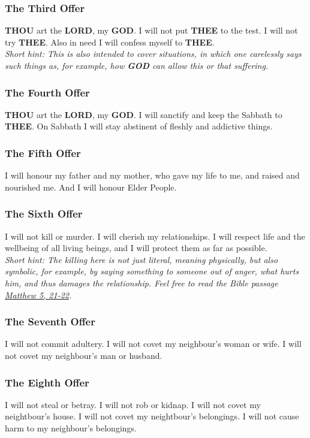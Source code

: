 \documentclass[12pt,a4paper]{article}
\newcommand{\God}[0]{\textbf{GOD}}
\newcommand{\Lord}[0]{\textbf{LORD}}
\newcommand{\Thee}[0]{\textbf{THEE}}
\newcommand{\Thou}[0]{\textbf{THOU}}
\begin{document}
	\subsubsection{The Third Offer}
		{\Thou} art the {\Lord},
		my {\God}.
		I will not put {\Thee} to the test.
		I will not try {\Thee}.
		Also in need I will confess myself to {\Thee}.
		\\
		\textit{Short hint:
		This is also intended to cover situations,
		in which one carelessly says such things as,
		for example,
		how {\God} can allow this or that suffering.}
		
	\subsubsection{The Fourth Offer}
		{\Thou} art the {\Lord},
		my {\God}.
		I will sanctify and keep the Sabbath to {\Thee}.
		On Sabbath I will stay abstinent of fleshly
		and addictive things.
		
	\subsubsection{The Fifth Offer}
		I will honour my father and my mother,
		who gave my life to me,
		and raised and nourished me.
		And I will honour Elder People.
			
	\subsubsection{The Sixth Offer} \label{TheSixthOffer}
		I will not kill or murder.
		I will cherish my relationships.
		I will respect life and the wellbeing of all living beings,
		and I will protect them as far as possible.
		\\
		\textit{Short hint:
		The killing here is not just literal,
		meaning physically,
		but also symbolic,
		for example,
		by saying something to someone out of anger,
		what hurts him,
		and thus damages the relationship.
		Feel free to read the Bible passage \href{https://www.die-bibel.de/bibeln/online-bibeln/lesen/ESV/MAT.5/Matthew-5}{Matthew 5, 21-22}.}
		
	\subsubsection{The Seventh Offer}
		I will not commit adultery.
		I will not covet my neighbour's woman or wife.
		I will not covet my neighbour's man or husband.
		
	\subsubsection{The Eighth Offer}
		I will not steal or betray.
		I will not rob or kidnap.
		I will not covet my neightbour's house.
		I will not covet my neightbour's belongings.
		I will not cause harm to my neighbour's belongings.
		
\end{document}
